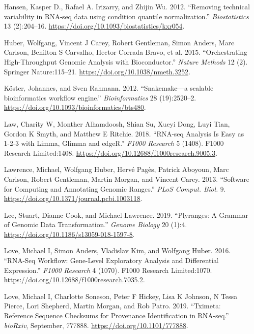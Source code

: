 \documentclass[
]{article}
\begin{document}
\leavevmode\hypertarget{ref-Hansen2012}{}%
Hansen, Kasper D., Rafael A. Irizarry, and Zhijin Wu. 2012. ``Removing technical variability in RNA-seq data using condition quantile normalization.'' \emph{Biostatistics} 13 (2):204--16. \url{https://doi.org/10.1093/biostatistics/kxr054}.

\leavevmode\hypertarget{ref-bioc}{}%
Huber, Wolfgang, Vincent J Carey, Robert Gentleman, Simon Anders, Marc Carlson, Benilton S Carvalho, Hector Corrada Bravo, et al. 2015. ``Orchestrating High-Throughput Genomic Analysis with Bioconductor.'' \emph{Nature Methods} 12 (2). Springer Nature:115--21. \url{https://doi.org/10.1038/nmeth.3252}.

\leavevmode\hypertarget{ref-snakemake}{}%
Köster, Johannes, and Sven Rahmann. 2012. ``Snakemake---a scalable bioinformatics workflow engine.'' \emph{Bioinformatics} 28 (19):2520--2. \url{https://doi.org/10.1093/bioinformatics/bts480}.

\leavevmode\hypertarget{ref-Law2018-f1000}{}%
Law, Charity W, Monther Alhamdoosh, Shian Su, Xueyi Dong, Luyi Tian, Gordon K Smyth, and Matthew E Ritchie. 2018. ``RNA-seq Analysis Is Easy as 1-2-3 with Limma, Glimma and edgeR.'' \emph{F1000 Research} 5 (1408). F1000 Research Limited:1408. \url{https://doi.org/10.12688/f1000research.9005.3}.

\leavevmode\hypertarget{ref-granges}{}%
Lawrence, Michael, Wolfgang Huber, Hervé Pagès, Patrick Aboyoun, Marc Carlson, Robert Gentleman, Martin Morgan, and Vincent Carey. 2013. ``Software for Computing and Annotating Genomic Ranges.'' \emph{PLoS Comput. Biol.} 9. \url{https://doi.org/10.1371/journal.pcbi.1003118}.

\leavevmode\hypertarget{ref-Lee2019}{}%
Lee, Stuart, Dianne Cook, and Michael Lawrence. 2019. ``Plyranges: A Grammar of Genomic Data Transformation.'' \emph{Genome Biology} 20 (1):4. \url{https://doi.org/10.1186/s13059-018-1597-8}.

\leavevmode\hypertarget{ref-Love2016-f1000}{}%
Love, Michael I, Simon Anders, Vladislav Kim, and Wolfgang Huber. 2016. ``RNA-Seq Workflow: Gene-Level Exploratory Analysis and Differential Expression.'' \emph{F1000 Research} 4 (1070). F1000 Research Limited:1070. \url{https://doi.org/10.12688/f1000research.7035.2}.

\leavevmode\hypertarget{ref-Love2019-tximeta}{}%
Love, Michael I, Charlotte Soneson, Peter F Hickey, Lisa K Johnson, N Tessa Pierce, Lori Shepherd, Martin Morgan, and Rob Patro. 2019. ``Tximeta: Reference Sequence Checksums for Provenance Identification in RNA-seq.'' \emph{bioRxiv}, September, 777888. \url{https://doi.org/10.1101/777888}.
\end{document}
